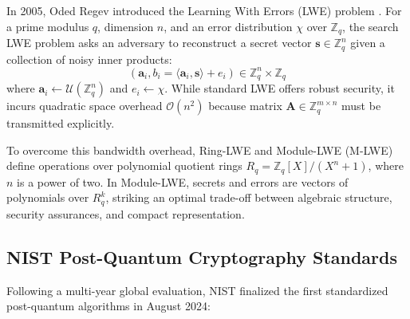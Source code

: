 In 2005, Oded Regev introduced the Learning With Errors (LWE) problem \cite{shor1994algorithms}. For a prime modulus $q$, dimension $n$, and an error distribution $\chi$ over $\mathbb{Z}_q$, the search LWE problem asks an adversary to reconstruct a secret vector $\mathbf{s} \in \mathbb{Z}_q^n$ given a collection of noisy inner products:
\begin{equation}
    (\mathbf{a}_i, b_i = \langle \mathbf{a}_i, \mathbf{s} \rangle + e_i) \in \mathbb{Z}_q^n \times \mathbb{Z}_q
\end{equation}
where $\mathbf{a}_i \leftarrow \mathcal{U}(\mathbb{Z}_q^n)$ and $e_i \leftarrow \chi$. While standard LWE offers robust security, it incurs quadratic space overhead $\mathcal{O}(n^2)$ because matrix $\mathbf{A} \in \mathbb{Z}_q^{m \times n}$ must be transmitted explicitly.

To overcome this bandwidth overhead, Ring-LWE and Module-LWE (M-LWE) define operations over polynomial quotient rings $R_q = \mathbb{Z}_q[X] / (X^n + 1)$, where $n$ is a power of two. In Module-LWE, secrets and errors are vectors of polynomials over $R_q^k$, striking an optimal trade-off between algebraic structure, security assurances, and compact representation.

\subsection{NIST Post-Quantum Cryptography Standards}
Following a multi-year global evaluation, NIST finalized the first standardized post-quantum algorithms in August 2024:


